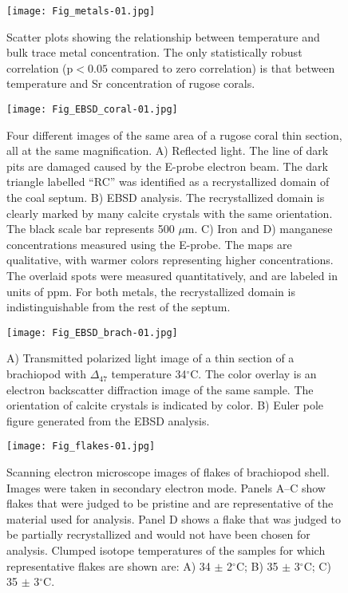 \documentclass{article}
\newcommand{\degrees}{$^{\circ}$}
\begin{document}
\begin{figure}[htb]
\centering
\texttt{[image: Fig\_metals-01.jpg]}
\caption{Scatter plots showing the relationship between temperature and bulk trace metal concentration. The only statistically robust correlation ($\text{p}<0.05$ compared to zero correlation) is that between temperature and Sr concentration of rugose corals.}
\label{metals}
\end{figure}

\begin{figure}[htb]
\centering
\texttt{[image: Fig\_EBSD\_coral-01.jpg]}
\caption{Four different images of the same area of a rugose coral thin section, all at the same magnification. A) Reflected light. The line of dark pits are damaged caused by the E-probe electron beam. The dark triangle labelled ``RC'' was identified as a recrystallized domain of the coal septum. B) EBSD analysis. The recrystallized domain is clearly marked by many calcite crystals with the same orientation. The black scale bar represents 500 $\mu$m. C) Iron and D) manganese concentrations measured using the E-probe. The maps are qualitative, with warmer colors representing higher concentrations. The overlaid spots were measured quantitatively, and are labeled in units of ppm. For both metals, the recrystallized domain is indistinguishable from the rest of the septum.}
\label{EBSD_coral}
\end{figure}

\begin{figure}[htb]
\centering
\texttt{[image: Fig\_EBSD\_brach-01.jpg]}
\caption{A) Transmitted polarized light image of a thin section of a brachiopod with $\Delta_{47}$ temperature 34\degrees C. The color overlay is an electron backscatter diffraction image of the same sample. The orientation of calcite crystals is indicated by color. B) Euler pole figure generated from the EBSD analysis.}
\label{EBSD_brach}
\end{figure}

\begin{figure}[htb]
\centering
\texttt{[image: Fig\_flakes-01.jpg]}
\caption{Scanning electron microscope images of flakes of brachiopod shell. Images were taken in secondary electron mode. Panels A--C show flakes that were judged to be pristine and are representative of the material used for analysis. Panel D shows a flake that was judged to be partially recrystallized and would not have been chosen for analysis. Clumped isotope temperatures of the samples for which representative flakes are shown are: A) 34 $\pm$ 2\degrees C; B) 35 $\pm$ 3\degrees C; C) 35 $\pm$ 3\degrees C.}
\label{flakes}
\end{figure}
\end{document}
